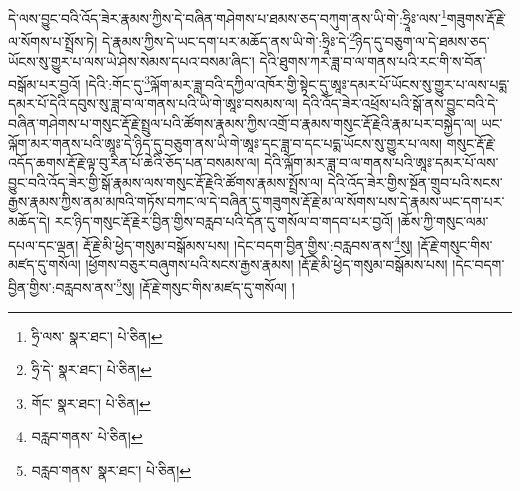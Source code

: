 དེ་ལས་བྱུང་བའི་འོད་ཟེར་རྣམས་ཀྱིས་དེ་བཞིན་གཤེགས་པ་ཐམས་ཅད་བཀུག་ནས་ཡི་གེ་:ཧྲཱིཿ་ལས་\footnote{ཧྲི་ལས་  སྣར་ཐང་།  པེ་ཅིན། }གཟུགས་རྡོ་རྗེ་ལ་སོགས་པ་སྤྲོས་ཏེ། དེ་རྣམས་ཀྱིས་དེ་ཡང་དག་པར་མཆོད་ནས་ཡི་གེ་:ཧྲཱིཿ་དེ་\footnote{ཧྲི་དེ་  སྣར་ཐང་།  པེ་ཅིན། }ཉིད་དུ་བཅུག་ལ་དེ་ཐམས་ཅད་ཡོངས་སུ་གྱུར་པ་ལས་ཡེ་ཤེས་སེམས་དཔའ་བསམ་ཞིང་། དེའི་ཐུགས་ཀར་ཟླ་བ་ལ་གནས་པའི་རང་གི་ས་བོན་བསྒོམ་པར་བྱའོ། །དེའི་:གོང་དུ་\footnote{གོང་  སྣར་ཐང་།  པེ་ཅིན། }ལྐོག་མར་ཟླ་བའི་དཀྱིལ་འཁོར་གྱི་སྟེང་དུ་ཨཱཿ་དམར་པོ་ཡོངས་སུ་གྱུར་པ་ལས་པདྨ་དམར་པོ་དེའི་དབུས་སུ་ཟླ་བ་ལ་གནས་པའི་ཡི་གེ་ཨཱཿ་བསམས་ལ། དེའི་འོད་ཟེར་འཕྲོས་པའི་སྒོ་ནས་བྱུང་བའི་དེ་བཞིན་གཤེགས་པ་གསུང་རྡོ་རྗེ་སྤྲུལ་པའི་ཚོགས་རྣམས་ཀྱིས་འགྲོ་བ་རྣམས་གསུང་རྡོ་རྗེའི་རྣམ་པར་བསྐྱེད་ལ། ཡང་ལྐོག་མར་གནས་པའི་ཨཱཿ་དེ་ཉིད་དུ་བཅུག་ནས་ཡི་གེ་ཨཱཿ་དང་ཟླ་བ་དང་པདྨ་ཡོངས་སུ་གྱུར་པ་ལས། གསུང་རྡོ་རྗེ་འདོད་ཆགས་རྡོ་རྗེ་ལྟ་བུ་རིན་པོ་ཆེའི་ཅོད་པན་བསམས་ལ། དེའི་ལྐོག་མར་ཟླ་བ་ལ་གནས་པའི་ཨཱཿ་དམར་པོ་ལས་བྱུང་བའི་འོད་ཟེར་གྱི་སྒོ་རྣམས་ལས་གསུང་རྡོ་རྗེའི་ཚོགས་རྣམས་སྤྲོས་ལ། དེའི་འོད་ཟེར་གྱིས་སྔོན་གྲུབ་པའི་སངས་རྒྱས་རྣམས་ཀྱིས་ནམ་མཁའི་གཏོས་བཀང་ལ་དེ་བཞིན་དུ་གཟུགས་རྡོ་རྗེ་མ་ལ་སོགས་པས་དེ་རྣམས་ཡང་དག་པར་མཆོད་དེ། རང་ཉིད་གསུང་རྡོ་རྗེར་བྱིན་གྱིས་བརླབ་པའི་དོན་དུ་གསོལ་བ་གདབ་པར་བྱའོ། །ཆོས་ཀྱི་གསུང་ལམ་དཔལ་དང་ལྡན། རྡོ་རྗེ་མི་ཕྱེད་གསུམ་བསྒོམས་པས། །དེང་བདག་བྱིན་གྱིས་:བརླབས་ནས་\footnote{བརླབ་གནས་  པེ་ཅིན། }སུ། །རྡོ་རྗེ་གསུང་གིས་མཛད་དུ་གསོལ། །ཕྱོགས་བཅུར་བཞུགས་པའི་སངས་རྒྱས་རྣམས། །རྡོ་རྗེ་མི་ཕྱེད་གསུམ་བསྒོམས་པས། །དེང་བདག་བྱིན་གྱིས་:བརླབས་ནས་\footnote{བརླབ་གནས་  སྣར་ཐང་།  པེ་ཅིན། }སུ། །རྡོ་རྗེ་གསུང་གིས་མཛད་དུ་གསོལ། །
